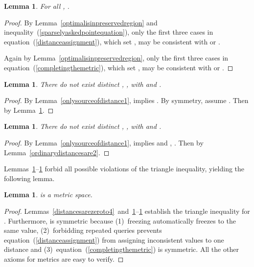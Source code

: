 \documentclass[letterpaper,12pt]{article}
\newtheorem{lemma}[theorem]{Lemma}
\newcommand{\comment}[1]{}
\begin{document}
\comment{\begin{lemma}\label{askeddistancesincidentonoptimalpoint}
For all ,
.
\end{lemma}
\begin{proof}
By Lemma~\ref{sparselyaskedpoint},
.
, which
together with equation~(\ref{badpoints}) and
Lemma~\ref{monotonicity}
completes the proof.
\end{proof}
}
\begin{lemma}\label{optimalpointdistances1or3}
For all ,
.
\end{lemma}
\begin{proof}
By
Lemma~\ref{optimalisinpreservedregion} and
inequality~(\ref{sparselyaskedpointequation}),
only
the first three
cases in
equation~(\ref{distanceassignment}),
which set ,
may be consistent with
 or .

Again by Lemma~\ref{optimalisinpreservedregion},
only the first three cases in equation~(\ref{completingthemetric}),
which set ,
may be consistent with  or .
\end{proof}

\begin{lemma}\label{illegaldistances1}
There do not exist distinct , , 
with  and .
\end{lemma}
\begin{proof}
By Lemma~\ref{onlysourceofdistance1},
 implies .
By symmetry, assume .
Then  by
Lemma~\ref{optimalpointdistances1or3}.
\end{proof}

\begin{lemma}\label{illegaldistances2}
There do not exist distinct , , 
with  and .
\end{lemma}
\begin{proof}
By Lemma~\ref{onlysourceofdistance1},
 implies  and , .
Then  by
Lemma~\ref{ordinarydistancesare2}.
\end{proof}


Lemmas~\ref{illegaldistances1}--\ref{illegaldistances2}
forbid all possible violations of the triangle inequality,
yielding the following lemma.


\begin{lemma}\label{itismetric}
 is a metric space.
\end{lemma}
\begin{proof}
Lemmas~\ref{distancesarezeroto4}~and~\ref{illegaldistances1}--\ref{illegaldistances2}
establish the triangle inequality for .
Furthermore,  is symmetric because (1)~freezing  automatically
freezes  to the same value,
(2)~forbidding
repeated queries
prevents equation~(\ref{distanceassignment})
from assigning inconsistent values to one distance and
(3)~equation~(\ref{completingthemetric}) is symmetric.
All the other axioms for metrics
are easy to verify.
\end{proof}
\end{document}
